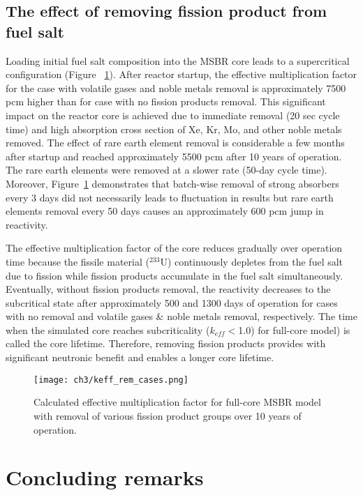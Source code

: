 \subsection{The effect of removing fission product from fuel salt}
Loading initial fuel salt composition into the \gls{MSBR} core leads to a 
supercritical configuration (Figure ~\ref{fig:fp_removal}). After reactor 
startup, the effective multiplication factor for the case with volatile gases 
and noble metals removal is approximately 7500 pcm  higher than for case with 
no fission products removal. This significant impact on the reactor core is
achieved due to immediate removal (20 sec cycle time) and high absorption cross 
section of Xe, Kr, Mo, and other noble metals removed. The effect of rare earth 
element removal is considerable a few months after startup and reached 
approximately 5500 pcm after 10 years of operation. The rare earth elements 
were removed at a slower rate (50-day cycle time). Moreover,  
Figure~\ref{fig:fp_removal} demonstrates that batch-wise removal of strong 
absorbers every 3 days did not necessarily leads to fluctuation in results 
but rare earth elements removal every 50 days causes an approximately 600 pcm 
jump in reactivity.

The effective multiplication factor of the core reduces gradually over 
operation time because the fissile material ($^{233}$U) continuously depletes 
from the fuel salt due to fission while fission products accumulate in the fuel 
salt simultaneously. Eventually, without fission products removal, the 
reactivity decreases to the subcritical state after approximately 500 and 
1300 days of operation for cases with no removal and volatile gases \& noble 
metals removal, respectively. The time when the simulated core reaches 
subcriticality ($k_{eff}<$1.0) for full-core model) is called the core 
lifetime. Therefore, removing fission products provides with significant 
neutronic benefit and enables a longer core lifetime.
\begin{figure}[ht!] %
	\centering
	\texttt{[image: ch3/keff\_rem\_cases.png]} 
	\caption{Calculated effective multiplication factor for full-core 
	\gls{MSBR} model with removal of various fission product groups over 10 
	years of operation.}
	\label{fig:fp_removal}
\end{figure}


\section{Concluding remarks}